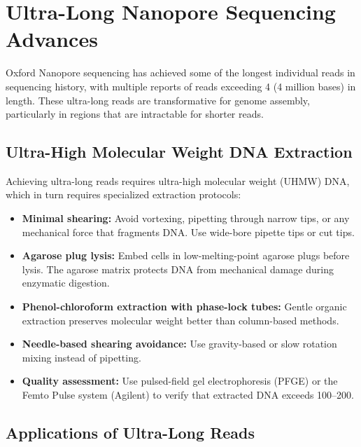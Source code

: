 \section{Ultra-Long Nanopore Sequencing Advances}
\label{sec:emerging:ultra-long}

Oxford Nanopore sequencing has achieved some of the longest individual reads in sequencing history, with multiple reports of reads exceeding 4\megabase{} (4 million bases) in length. These ultra-long reads are transformative for genome assembly, particularly in regions that are intractable for shorter reads.

\subsection{Ultra-High Molecular Weight DNA Extraction}
\label{subsec:emerging:uhmw-extraction}

Achieving ultra-long reads requires ultra-high molecular weight (UHMW) DNA, which in turn requires specialized extraction protocols:

\begin{protocolbox}[title={Ultra-Long DNA Extraction Key Principles}]
\begin{itemize}[itemsep=2pt]
  \item \textbf{Minimal shearing:} Avoid vortexing, pipetting through narrow tips, or any mechanical force that fragments DNA. Use wide-bore pipette tips or cut tips.
  \item \textbf{Agarose plug lysis:} Embed cells in low-melting-point agarose plugs before lysis. The agarose matrix protects DNA from mechanical damage during enzymatic digestion.
  \item \textbf{Phenol-chloroform extraction with phase-lock tubes:} Gentle organic extraction preserves molecular weight better than column-based methods.
  \item \textbf{Needle-based shearing avoidance:} Use gravity-based or slow rotation mixing instead of pipetting.
  \item \textbf{Quality assessment:} Use pulsed-field gel electrophoresis (PFGE) or the Femto Pulse system (Agilent) to verify that extracted DNA exceeds 100--200\kilobase{}.
\end{itemize}
\end{protocolbox}

\subsection{Applications of Ultra-Long Reads}
\label{subsec:emerging:ultra-long-apps}

